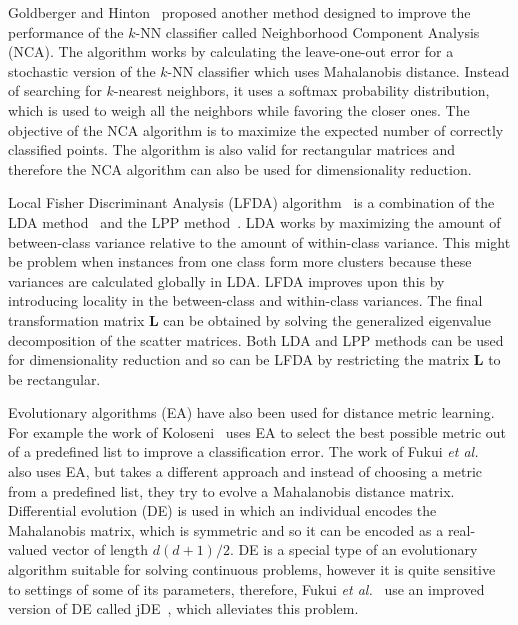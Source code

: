 Goldberger and Hinton~\cite{jacobgoldberger2004neighbourhood} proposed another method designed to improve the performance of the $k$-NN classifier called Neighborhood Component Analysis (NCA). The algorithm works by calculating the leave-one-out error for a stochastic version of the $k$-NN classifier which uses Mahalanobis distance. Instead of searching for $k$-nearest neighbors, it uses a softmax probability distribution, which is used to weigh all the neighbors while favoring the closer ones. The objective of the NCA algorithm is to maximize the expected number of correctly classified points. The algorithm is also valid for rectangular matrices and therefore the NCA algorithm can also be used for dimensionality reduction.

Local Fisher Discriminant Analysis (LFDA) algorithm~\cite{sugiyama2007dimensionality} is a combination of the LDA method~\cite{fisher1936use} and the LPP method~\cite{he2003locality}. LDA works by maximizing the amount of between-class variance relative to the amount of within-class variance. This might be problem when instances from one class form more clusters because these variances are calculated globally in LDA. LFDA improves upon this by introducing locality in the between-class and within-class variances. The final transformation matrix $\bm{L}$ can be obtained by solving the generalized eigenvalue decomposition of the scatter matrices. Both LDA and LPP methods can be used for dimensionality reduction and so can be LFDA by restricting the matrix $\bm{L}$ to be rectangular.

Evolutionary algorithms (EA) have also been used for distance metric learning. For example the work of Koloseni~\cite{koloseni2012optimized} uses EA to select the best possible metric out of a predefined list to improve a classification error. The work of Fukui \emph{et al.}~\cite{fukui2013evolutionary} also uses EA, but takes a different approach and instead of choosing a metric from a predefined list, they try to evolve a Mahalanobis distance matrix. Differential evolution (DE) is used in which an individual encodes the Mahalanobis matrix, which is symmetric and so it can be encoded as a real-valued vector of length $d(d+1)/2$. DE is a special type of an evolutionary algorithm suitable for solving continuous problems, however it is quite sensitive to settings of some of its parameters, therefore, Fukui \emph{et al.}~\cite{fukui2013evolutionary} use an improved version of DE called jDE~\cite{brest2006self}, which alleviates this problem.

